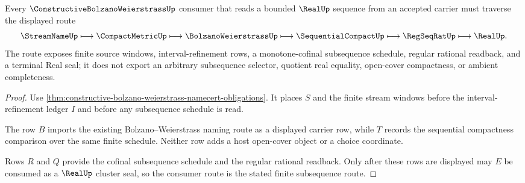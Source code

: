 \begin{theorem}
\label{thm:constructive-bolzano-weierstrass-bounded-real-subsequence-route}
Every $\ConstructiveBolzanoWeierstrassUp$ consumer that reads a bounded $\RealUp$ sequence from an accepted carrier must traverse the displayed route
$$
\StreamNameUp \longmapsto \CompactMetricUp \longmapsto \BolzanoWeierstrassUp \longmapsto \SequentialCompactUp \longmapsto \RegSeqRatUp \longmapsto \RealUp .
$$
The route exposes finite source windows, interval-refinement rows, a monotone-cofinal subsequence schedule, regular rational readback, and a terminal Real seal; it does not export an arbitrary subsequence selector, quotient real equality, open-cover compactness, or ambient completeness.
\end{theorem}
\begin{proof}
Use \autoref{thm:constructive-bolzano-weierstrass-namecert-obligations}. It places $S$ and the finite stream windows before the interval-refinement ledger $I$ and before any subsequence schedule is read.

The row $B$ imports the existing Bolzano--Weierstrass naming route as a displayed carrier row, while $T$ records the sequential compactness comparison over the same finite schedule. Neither row adds a host open-cover object or a choice coordinate.

Rows $R$ and $Q$ provide the cofinal subsequence schedule and the regular rational readback. Only after these rows are displayed may $E$ be consumed as a $\RealUp$ cluster seal, so the consumer route is the stated finite subsequence route.
\end{proof}

